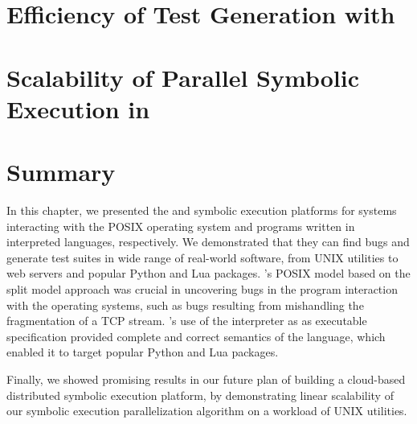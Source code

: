 \section{Efficiency of Test Generation with \chef}
\label{sec:eval:chef-efficiency}


\section{Scalability of Parallel Symbolic Execution in \cnine}
\label{sec:eval:cnine-efficiency}


\section{Summary}

In this chapter, we presented the \cnine and \chef symbolic execution platforms for systems interacting with the POSIX operating system and programs written in interpreted languages, respectively.
%
We demonstrated that they can find bugs and generate test suites in wide range of real-world software, from UNIX utilities to web servers and popular Python and Lua packages.
%
\cnine's POSIX model based on the split model approach was crucial in uncovering bugs in the program interaction with the operating systems, such as bugs resulting from mishandling the fragmentation of a TCP stream.
%
\chef's use of the interpreter as as executable specification provided complete and correct semantics of the language, which enabled it to target popular Python and Lua packages.

Finally, we showed promising results in our future plan of building a cloud-based distributed symbolic execution platform, by demonstrating linear scalability of our symbolic execution parallelization algorithm on a workload of UNIX utilities.


